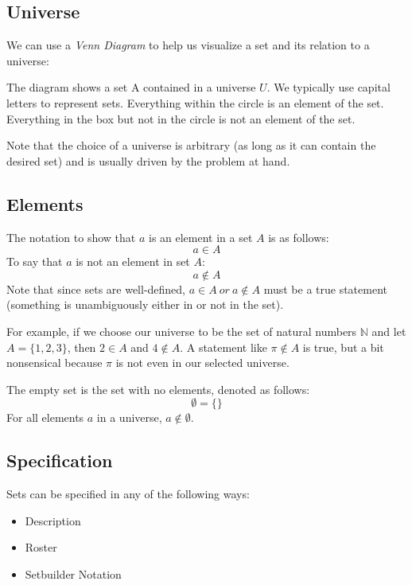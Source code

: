 \documentclass[letterpaper,12pt,fleqn]{article}
\begin{document}
\subsection*{Universe}

We can use a \emph{Venn Diagram} to help us visualize a set and its relation to
a universe:

\begin{center}
\end{center}

The diagram shows a set A contained in a universe $U$. We typically use capital
letters to represent sets. Everything within the circle is an element of the
set. Everything in the box but not in the circle is not an element of the set.

Note that the choice of a universe is arbitrary (as long as it can contain the
desired set) and is usually driven by the problem at hand.

\subsection*{Elements}

The notation to show that $a$ is an element in a set $A$ is as follows:
\[a\in A\]
To say that $a$ is not an element in set $A$:
\[a\notin A\]
Note that since sets are well-defined, $a\in A\ or\ a\notin A$ must be a true
statement (something is unambiguously either in or not in the set).

For example, if we choose our universe to be the set of natural numbers
$\mathbb{N}$ and let $A=\{1, 2, 3\}$, then $2\in A$ and $4\notin A$. A statement
like $\pi\notin A$ is true, but a bit nonsensical because $\pi$ is not even in
our selected universe.

The empty set is the set with no elements, denoted as follows:
\[\emptyset=\{\}\]
For all elements $a$ in a universe, $a\notin\emptyset$.

\newpage

\subsection*{Specification}

Sets can be specified in any of the following ways:

\begin{itemize}
\item Description
\item Roster
\item Setbuilder Notation
\end{itemize}
\end{document}
